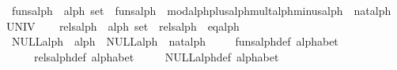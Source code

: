 \begin{isabellebody}
\ funs{}alph\ {}{}\ {}alph\ set{}\ \ {}funs{}alph\ {}\ {}mod{}alph{}plus{}alph{}mult{}alph{}minus{}alph{}\ {}\ {}nat{}alph\ {}\ UNIV{}{}\isanewline
\isanewline
\ \ \isamarkupfalse%
\ rels{}alph\ {}{}\ {}alph\ set{}\ \ {}rels{}alph\ {}\ {}eq{}alph{}{}\isanewline
\isanewline
\ \ \isamarkupfalse%
\ NULL{}alph\ {}{}\ {}alph{}\ \ {}NULL{}alph\ {}\ nat{}alph\ {}{}\isanewline
\isanewline
\ \ \isamarkupfalse%
\ funs{}alph{}def\ {}alphabet{}\isanewline
\ \ \ \ \ rels{}alph{}def\ {}alphabet{}\isanewline
\ \ \ \ \ NULL{}alph{}def\ {}alphabet{}\isanewline

\end{isabellebody}
